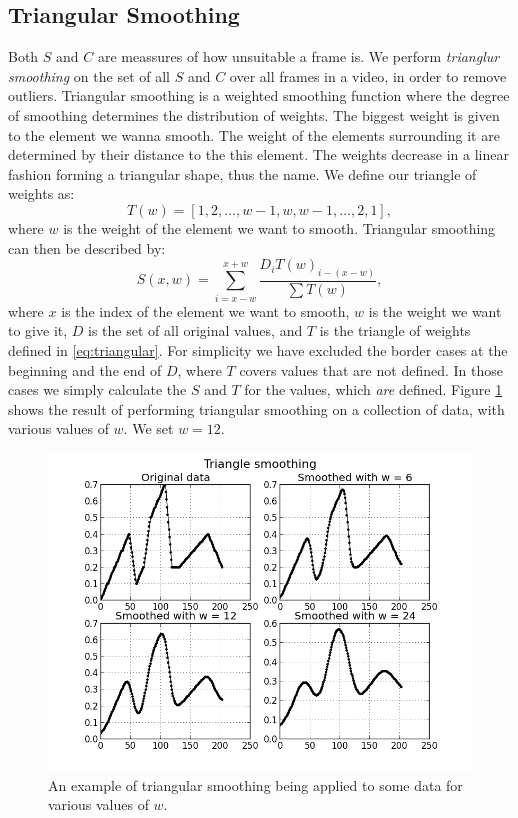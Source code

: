 \subsection{Triangular Smoothing}\label{sec:triangularsmoothing}
%
Both $S$ and $C$ are meassures of how unsuitable a frame is. We perform \textit{trianglur smoothing} on the set of all $S$ and $C$ over all frames in a video, in order to remove outliers. Triangular smoothing is a weighted smoothing function where the degree of smoothing determines the distribution of weights. The biggest weight is given to the element we wanna smooth. The weight of the elements surrounding it are determined by their distance to the this element. The weights decrease in a linear fashion forming a triangular shape, thus the name. We define our triangle of weights as:
%
\begin{equation}
T(w) = [1,2,\dots,w-1,w,w-1,\dots,2,1],
\end{equation}\label{eq:triangular}
%
where $w$ is the weight of the element we want to smooth.
Triangular smoothing can then be described by:
%
\[
S(x, w) = \sum_{i=x-w}^{x+w} \frac{D_{i} T(w)_{i-(x-w)}}{\sum T(w)},
\]
%
where $x$ is the index of the element we want to smooth, $w$ is the weight we want to give it, $D$ is the set of all original values, and $T$ is the triangle of weights defined in \ref{eq:triangular}. For simplicity we have excluded the border cases at the beginning and the end of $D$, where $T$ covers values that are not defined. In those cases we simply calculate the $S$ and $T$ for the values, which \textit{are} defined. Figure \ref{fig:triangularsmoothing} shows the result of performing triangular smoothing on a collection of data, with various values of $w$. We set $w = 12$.
%
\begin{figure}
     \centering
     \includegraphics[width=1\textwidth]{img/triangle_smooth.png}
     \caption{An example of triangular smoothing being applied to some data for various values of $w$.}
     \label{fig:triangularsmoothing}
\end{figure}
%
